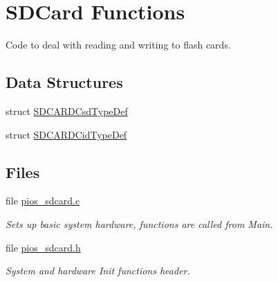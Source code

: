 \hypertarget{group___p_i_o_s___s_d_c_a_r_d}{\section{\-S\-D\-Card \-Functions}
\label{group___p_i_o_s___s_d_c_a_r_d}
}


\-Code to deal with reading and writing to flash cards.  


\subsection*{\-Data \-Structures}
\begin{DoxyCompactItemize}
\item 
struct \hyperlink{struct_s_d_c_a_r_d_csd_type_def}{\-S\-D\-C\-A\-R\-D\-Csd\-Type\-Def}
\item 
struct \hyperlink{struct_s_d_c_a_r_d_cid_type_def}{\-S\-D\-C\-A\-R\-D\-Cid\-Type\-Def}
\end{DoxyCompactItemize}
\subsection*{\-Files}
\begin{DoxyCompactItemize}
\item 
file \hyperlink{pios__sdcard_8c}{pios\-\_\-sdcard.\-c}
\begin{DoxyCompactList}\small\item\em \-Sets up basic system hardware, functions are called from \-Main. \end{DoxyCompactList}\item 
file \hyperlink{pios__sdcard_8h}{pios\-\_\-sdcard.\-h}
\begin{DoxyCompactList}\small\item\em \-System and hardware \-Init functions header. \end{DoxyCompactList}\end{DoxyCompactItemize}
